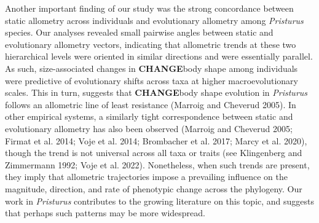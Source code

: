 \documentclass[
  11pt,
]{article}
\begin{document}
Another important finding of our study was the strong concordance
between static allometry across individuals and evolutionary allometry
among \emph{Pristurus} species. Our analyses revealed small pairwise
angles between static and evolutionary allometry vectors, indicating
that allometric trends at these two hierarchical levels were oriented in
similar directions and were essentially parallel. As such,
size-associated changes in \textbf{CHANGE}body shape among individuals
were predictive of evolutionary shifts across taxa at higher
macroevolutionary scales. This in turn, suggests that
\textbf{CHANGE}body shape evolution in \emph{Pristurus} follows an
allometric line of least resistance (Marroig and Cheverud 2005). In
other empirical systems, a similarly tight correspondence between static
and evolutionary allometry has also been observed (Marroig and Cheverud
2005; Firmat et al. 2014; Voje et al. 2014; Brombacher et al. 2017;
Marcy et al. 2020), though the trend is not universal across all taxa or
traits (see Klingenberg and Zimmermann 1992; Voje et al. 2022).
Nonetheless, when such trends are present, they imply that allometric
trajectories impose a prevailing influence on the magnitude, direction,
and rate of phenotypic change across the phylogeny. Our work in
\emph{Pristurus} contributes to the growing literature on this topic,
and suggests that perhaps such patterns may be more
widespread.\hfill\break
\end{document}
